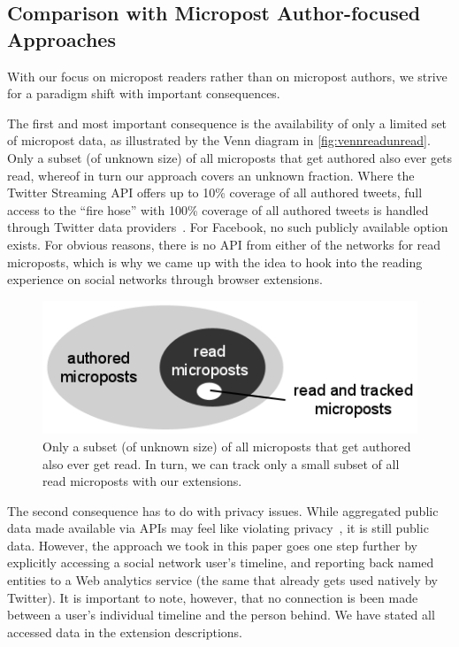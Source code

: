 \documentclass{iosart2c}
\begin{document}
\subsection{Comparison with Micropost Author-focused Approaches} \label{sec:comparison}
With our focus on micropost readers rather than on micropost authors, we strive for a paradigm shift with important consequences.

The first and most important consequence is the availability of only a limited set of micropost data, as illustrated by the Venn diagram in \autoref{fig:vennreadunread}.
Only a subset (of unknown size) of all microposts that get authored also ever gets read, whereof in turn our approach covers an unknown fraction.
Where the Twitter Streaming API offers up to 10\% coverage of all authored tweets, full access to the ``fire hose'' with 100\% coverage of all authored tweets is handled through Twitter data providers~\cite{dataproviders}.
For Facebook, no such publicly available option exists.
For obvious reasons, there is no API from either of the networks for read microposts, which is why we came up with the idea to hook into the reading experience on social networks through browser extensions.

\begin{figure}
\centering
\includegraphics[width=0.6\linewidth]{./resources/vennreadunread.png}
\caption{Only a subset (of unknown size) of all microposts that get authored also ever get read. In turn, we can track only a small subset of all read microposts with our extensions.}
\label{fig:vennreadunread}
\end{figure}

The second consequence has to do with privacy issues.
While aggregated public data made available via APIs may feel like violating privacy~\cite{nyt}, it is still public data.
However, the approach we took in this paper goes one step further by explicitly accessing a social network user's timeline, and reporting back named entities to a Web analytics service (the same that already gets used natively by Twitter). 
It is important to note, however, that no connection is been made between a user's individual timeline and the person behind.
We have stated all accessed data in the extension descriptions.
\end{document}
